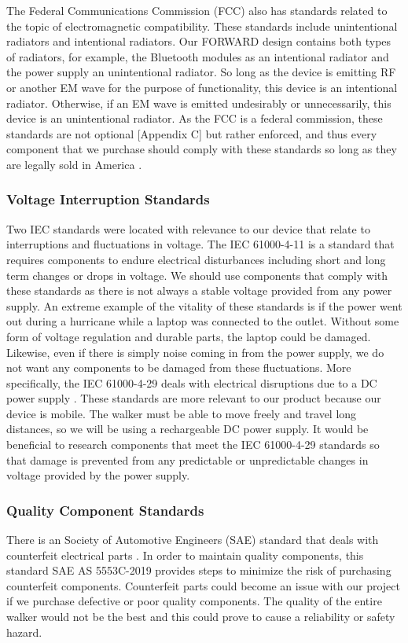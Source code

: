 \noindent The Federal Communications Commission (FCC) also has standards related to the topic of electromagnetic compatibility. These standards include unintentional radiators and intentional radiators. Our FORWARD design contains both types of radiators, for example, the Bluetooth modules as an intentional radiator and the power supply an unintentional radiator. So long as the device is emitting RF or another EM wave for the purpose of functionality, this device is an intentional radiator. Otherwise, if an EM wave is emitted undesirably or unnecessarily, this device is an unintentional radiator. As the FCC is a federal commission, these standards are not optional [Appendix C] but rather enforced, and thus every component that we purchase should comply with these standards so long as they are legally sold in America \cite{fcc_unintentional_radiators} \cite{fcc_intentional_radiators}.

\subsubsection{Voltage Interruption Standards}
\noindent Two IEC standards were located with relevance to our device that relate to interruptions and fluctuations in voltage. The IEC 61000-4-11\cite{iec_standard_2} is a standard that requires components to endure electrical disturbances including short and long term changes or drops in voltage. We should use components that comply with these standards as there is not always a stable voltage provided from any power supply. An extreme example of the vitality of these standards is if the power went out during a hurricane while a laptop was connected to the outlet. Without some form of voltage regulation and durable parts, the laptop could be damaged. Likewise, even if there is simply noise coming in from the power supply, we do not want any components to be damaged from these fluctuations. More specifically, the IEC 61000-4-29 deals with electrical disruptions due to a DC power supply \cite{iec_standard_3}. These standards are more relevant to our product because our device is mobile. The walker must be able to move freely and travel long distances, so we will be using a rechargeable DC power supply. It would be beneficial to research components that meet the IEC 61000-4-29 standards so that damage is prevented from any predictable or unpredictable changes in voltage provided by the power supply.


\subsubsection{Quality Component Standards}
\noindent There is an Society of Automotive Engineers (SAE) standard that deals with counterfeit electrical parts \cite{sae5553c2019}. In order to maintain quality components, this standard SAE AS 5553C-2019 provides steps to minimize the risk of purchasing counterfeit components. Counterfeit parts could become an issue with our project if we purchase defective or poor quality components. The quality of the entire walker would not be the best and this could prove to cause a reliability or safety hazard.\\

